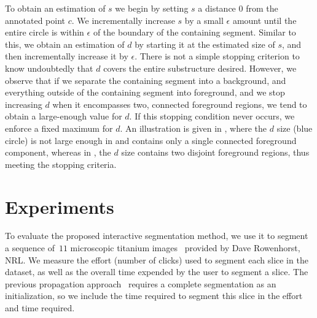 \documentclass[]{spie}  %
\begin{document}
To obtain an estimation of $s$ we begin by setting $s$ a distance $0$
from the annotated point $c$.  We incrementally increase $s$ by a
small $\epsilon$ amount until the entire circle is within $\epsilon$
of the boundary of the containing segment.  Similar to this, we obtain
an estimation of $d$ by starting it at the estimated size of $s$, and
then incrementally increase it by $\epsilon$.  There is not a simple
stopping criterion to know undoubtedly that $d$ covers the entire
substructure desired.  However, we observe that if we separate the
containing segment into a background, and everything outside of the
containing segment into foreground, and we stop increasing $d$ when it
encompasses two, connected foreground regions, we tend to obtain a
large-enough value for $d$.  If this stopping condition never occurs,
we enforce a fixed maximum for $d$.  An illustration is given in
, where the $d$ size (blue circle) is not large enough in
 and contains only a single connected foreground
component, whereas in , the $d$ size contains two
disjoint foreground regions, thus meeting the stopping criteria.
\begin{figure}[htbp]
\centering
{}
\hspace{0.1em}
\caption{} \label{fig:d-size}
\end{figure}

\section{Experiments}
\label{sec:ex}

To evaluate the proposed interactive segmentation method, we use it to
segment a sequence of~$11$ microscopic titanium
images~\cite{rowenhorst:10} provided by Dave Rowenhorst, NRL.  We
measure the effort (\ie number of clicks) used to segment each slice
in the dataset, as well as the overall time expended by the user to
segment a slice.  The previous propagation approach~\cite{waggoner:11}
requires a complete segmentation as an initialization, so we include
the time required to segment this slice in the effort and time required.
\end{document}
